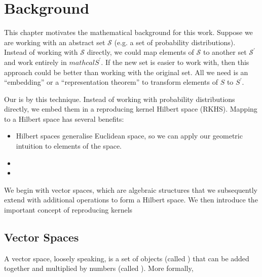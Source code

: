 \chapter{Background}
This chapter motivates the mathematical background for this work.  Suppose we are working with an abstract set $\mathcal{S}$ (e.g. a set of probability distributions). Instead of working with $\mathcal{S}$ directly, we could map elements of $\mathcal{S}$ to another set $\mathcal{S}^\prime$ and work entirely in $mathcal{S}^\prime$. If the new set is easier to work with, then this approach could be better than working with the original set. All we need is an ``embedding'' or a ``representation theorem'' to transform elements of $S$ to $S^\prime$.

Our  is  by this technique. Instead of working with probability distributions directly, we embed them in a reproducing kernel Hilbert space (RKHS). Mapping to a Hilbert space has several benefits:
%
\begin{itemize}
  \item Hilbert spaces generalise Euclidean space, so we can apply our geometric intuition to elements of the space.
  \item {}
  \item {}
\end{itemize}
%
We begin with vector spaces, which are algebraic structures that we subsequently extend with additional operations to form a Hilbert space. We then introduce the important concept of reproducing kernels

\section{Vector Spaces}
A vector space, loosely speaking, is a set of objects (called ) that can be added together and multiplied by numbers (called ). More formally,

